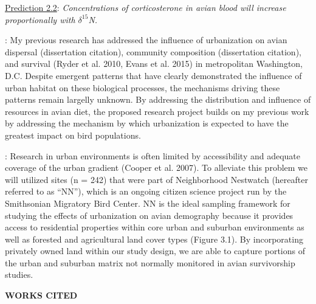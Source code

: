 \documentclass[12pt]{article}
\begin{document}
\noindent \underline{Prediction 2.2}: \textit{Concentrations of corticosterone in avian blood will increase proportionally with $\delta^{15}$N.} \par \par



: 
My previous research has addressed the influence of urbanization on avian dispersal (dissertation citation), community composition (dissertation citation), and survival (Ryder et al. 2010, Evans et al. 2015) in metropolitan Washington, D.C. Despite emergent patterns that have clearly demonstrated the influence of urban habitat on these biological processes, the mechanisms driving these patterns remain largelly unknown. By addressing the distribution and influence of resources in avian diet, the proposed research project builds on my previous work by addressing the mechanism by which urbanization is expected to have the greatest impact on bird populations.


:
Research in urban environments is often limited by accessibility and adequate coverage of the urban gradient (Cooper et al. 2007). To alleviate this problem we will utilized sites (n = 242) that were part of Neighborhood Nestwatch (hereafter referred to as “NN”), which is an ongoing citizen science project run by the Smithsonian Migratory Bird Center. NN is the ideal sampling framework for studying the effects of urbanization on avian demography because it provides access to residential properties within core urban and suburban environments as well as forested and agricultural land cover types (Figure 3.1). By incorporating privately owned land within our study design, we are able to capture portions of the urban and suburban matrix not normally monitored in avian survivorship studies.

\noindent \begin{center} {\textbf {WORKS CITED}}\end{center} \par
\end{document}
